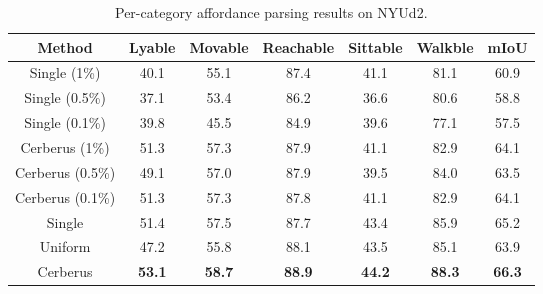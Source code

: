 \documentclass[10pt,twocolumn,letterpaper]{article}
\begin{document}
\begin{table*}
  \centering
  \small
  \begin{tabular}{c|ccccc|c}
    \toprule
    \textbf{Method} & Lyable & Movable & Reachable & Sittable & Walkble & mIoU \\
    \midrule
    Single (1\%)  & 40.1 & 55.1 & 87.4 & 41.1 & 81.1 & 60.9\\
    Single (0.5\%)  & 37.1 & 53.4 & 86.2 & 36.6 & 80.6 & 58.8 \\
    Single (0.1\%) &39.8 & 45.5 & 84.9 & 39.6 & 77.1 & 57.5\\
    \midrule
    Cerberus (1\%) &51.3 & 57.3 & 87.9 & 41.1 & 82.9& 64.1\\
    Cerberus (0.5\%)  &49.1 & 57.0 & 87.9 & 39.5 & 84.0& 63.5\\
    Cerberus (0.1\%) &51.3 & 57.3 & 87.8 & 41.1 & 82.9& 64.1\\
    \midrule
    Single &  51.4 & 57.5 & 87.7 & 43.4 & 85.9 &65.2\\
    Uniform &47.2 & 55.8 & 88.1 & 43.5 & 85.1&63.9\\
    Cerberus & \textbf{53.1} & \textbf{58.7} & \textbf{88.9} & \textbf{44.2} & \textbf{88.3}&\textbf{66.3}  \\
    \bottomrule
  \end{tabular}
  \caption{Per-category affordance parsing results on NYUd2.}
  \label{tab:aff}
\end{table*}
\end{document}

